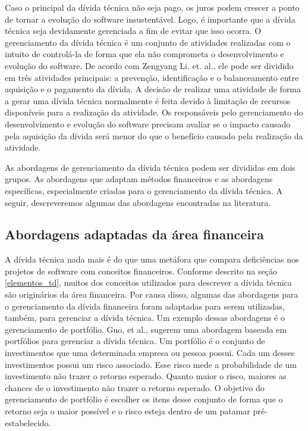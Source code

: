 Caso o principal da dívida técnica não seja pago, os juros podem crescer a ponto de tornar a evolução do software insustentável. Logo, é importante que a dívida técnica seja devidamente gerenciada a fim de evitar que isso ocorra\cite{power2013understanding}. O gerenciamento da dívida técnica é um conjunto de atividades realizadas com o intuito de controlá-la de forma que ela não comprometa o desenvolvimento e evolução do software. De acordo com Zengyang Li. et. al.\cite{li2015systematic}, ele pode ser dividido em três atividades principais: a prevenção, identificação e o balanceamento entre aquisição e o pagamento da dívida.  A decisão de realizar uma atividade de forma a gerar uma dívida técnica normalmente é feita devido à limitação de recursos disponíveis para a realização da atividade.  Os responsáveis pelo gerenciamento do desenvolvimento e evolução do software precisam avaliar se o impacto causado pela aquisição da dívida será menor do que o benefício causado pela realização da atividade.  



 
As abordagens de gerenciamento da dívida técnica podem ser divididas em dois grupos. As abordagens que adaptam métodos financeiros e as abordagens específicas, especialmente criadas para o gerenciamento da dívida técnica. A seguir, descreveremos algumas das abordagens encontradas na literatura.


\subsection{Abordagens adaptadas da área financeira}

 A dívida técnica nada mais é do que uma metáfora que compara deficiências nos projetos de software com conceitos financeiros. Conforme descrito na seção \ref{elementos_td}, muitos dos conceitos utilizados para descrever a dívida técnica são originários da área financeira. Por causa disso, algumas das abordagens para o gerenciamento da dívida financeira foram adaptadas para serem utilizadas, também, para gerenciar a dívida técnica. Um exemplo dessas abordagens é o gerenciamento de portfólio. \cite{guo2011portfolio} Guo, et al., sugerem uma abordagem baseada em portfólios para gerenciar a dívida técnica. Um portfólio é o conjunto de investimentos que uma determinada empresa ou pessoa possui. Cada um desses investimentos possui um risco associado. Esse risco mede a probabilidade de um investimento não trazer o retorno esperado. Quanto maior o risco, maiores as chances de o investimento não trazer o retorno esperado. O objetivo do gerenciamento de portfólio é escolher os itens desse conjunto de forma que o retorno seja o maior possível e o risco esteja dentro de um patamar pré-estabelecido. 


